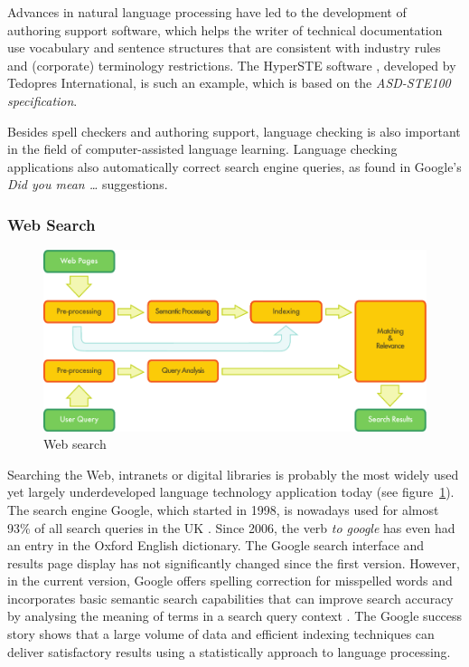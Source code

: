 \documentclass[]{../../metanetpaper}
\begin{document}
\begin{multicols}{2}

Advances in natural language processing have led to the development of authoring support software, which helps the writer of technical documentation use vocabulary and sentence structures that are consistent with industry rules and (corporate) terminology restrictions. The HyperSTE software \cite{hss}, developed by Tedopres International, is such an example, which is based on the \textit{ASD-STE100 specification}.

Besides spell checkers and authoring support, language checking is also important in the field of computer-assisted language learning. Language checking applications also automatically correct search engine queries, as found in Google's \textit{Did you mean \dots} suggestions.

\subsubsection{Web Search}

\begin{figure}[htb]
  \center
  \includegraphics[width=\textwidth]{../_media/english/web_search_architecture}
  \caption{Web search}
  \label{fig:websearcharch_en}
 \end{figure}

Searching the Web, intranets or digital libraries is probably the most widely used yet largely underdeveloped language technology application today (see figure~\ref{fig:websearcharch_en}). The search engine Google, which started in 1998, is nowadays used for almost 93\% of all search queries in the UK \cite{stats4}. Since 2006, the verb \textit{to google} has even had an entry in the Oxford English dictionary. The Google search interface and results page display has not significantly changed since the first version. However, in the current version, Google offers spelling correction for misspelled words and incorporates basic semantic search capabilities that can improve search accuracy by analysing the meaning of terms in a search query context \cite{pc1}.  The Google success story shows that a large volume of data and efficient indexing techniques can deliver satisfactory results using a statistically approach to language processing.


\end{multicols}
\end{document}
